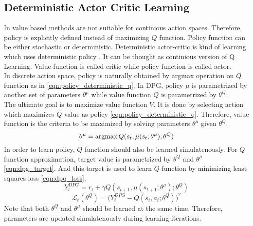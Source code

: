\subsection{Deterministic Actor Critic Learning}
In value based methods are not suitable for continious action spaces. Therefore, policy is explicitly defined instead of maximizing $Q$ function. Policy function can be either stochastic or deterministic.  Deterministic actor-critic is kind of learning which uses deterministic policy \cite{silver_deterministic_2014}. It can be thought as continious version of Q Learning. Value function is called critic while policy function is called actor. \\
In discrete action space, policy is naturally obtained by argmax operation on $Q$ function as in \ref{eqn:policy_deterministic_q}. In DPG, policy $\mu$ is parametrized by another set of parameters $\theta^\mu$ while value function $Q$ is parametrized by $\theta^Q$. \\
The ultimate goal is to maximize value function $V$. It is done by selecting action which maximizes $Q$ value as policy \eqref{eqn:policy_deterministic_q}. Therefore, value function is the criteria to be maximized by solving parameters $\theta^\mu$ given $\theta^Q$. 
\begin{equation}
\label{eqn:dpg_value_maximization}
\theta^\mu = \operatorname{\textup{argmax}} Q(s_t, \mu(s_t;\theta^\mu);\theta^Q)
\end{equation}
In order to learn policy, $Q$ function should also be learned simulatenously. For $Q$ function approximation, target value is parametrized by $\theta^Q$ and $\theta^\mu$ \eqref{eqn:dpg_target}. And this target is used to learn $Q$ function by minimizing least squares loss \eqref{eqn:dpq_loss}. \\
\begin{equation}
\label{eqn:dpg_target}
Y_t^{DPG} = r_t + \gamma Q(s_{t+1}, \mu(s_{t+1};\theta^\mu);\theta^Q)
\end{equation}
\begin{equation}
\label{eqn:dpq_loss}
\mathcal{L}_t(\theta^Q) = \big( Y_t^{DPG} - Q(s_t,a_t;\theta^Q) \big) ^ 2
\end{equation}
Note that both $\theta^Q$ and $\theta^\mu$ should be learned at the same time. Therefore, parameters are updated simulatenously during learning iterations. \\
